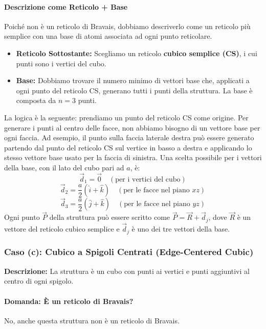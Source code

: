 \paragraph{Descrizione come Reticolo + Base}
Poiché non è un reticolo di Bravais, dobbiamo descriverlo come un reticolo più semplice con una base di atomi associata ad ogni punto reticolare.
\begin{itemize}
    \item \textbf{Reticolo Sottostante:} Scegliamo un reticolo \textbf{cubico semplice (CS)}, i cui punti sono i vertici del cubo.
    \item \textbf{Base:} Dobbiamo trovare il numero minimo di vettori base che, applicati a ogni punto del reticolo CS, generano tutti i punti della struttura. La base è composta da $n=3$ punti.
\end{itemize}
La logica è la seguente: prendiamo un punto del reticolo CS come origine. Per generare i punti al centro delle facce, non abbiamo bisogno di un vettore base per ogni faccia. Ad esempio, il punto sulla faccia laterale destra può essere generato partendo dal punto del reticolo CS sul vertice in basso a destra e applicando lo stesso vettore base usato per la faccia di sinistra.
Una scelta possibile per i vettori della base, con il lato del cubo pari ad $a$, è:
$$ \vec{d}_1 = \vec{0} \quad (\text{per i vertici del cubo}) $$
$$ \vec{d}_2 = \frac{a}{2}(\hat{i} + \hat{k}) \quad (\text{per le facce nel piano } xz) $$
$$ \vec{d}_3 = \frac{a}{2}(\hat{j} + \hat{k}) \quad (\text{per le facce nel piano } yz) $$
Ogni punto $\vec{P}$ della struttura può essere scritto come $\vec{P} = \vec{R} + \vec{d}_j$, dove $\vec{R}$ è un vettore del reticolo cubico semplice e $\vec{d}_j$ è uno dei tre vettori della base.

\subsubsection{Caso (c): Cubico a Spigoli Centrati (Edge-Centered Cubic)}
\textbf{Descrizione:} La struttura è un cubo con punti ai vertici e punti aggiuntivi al centro di ogni spigolo.

\paragraph{Domanda: È un reticolo di Bravais?}
No, anche questa struttura non è un reticolo di Bravais.

